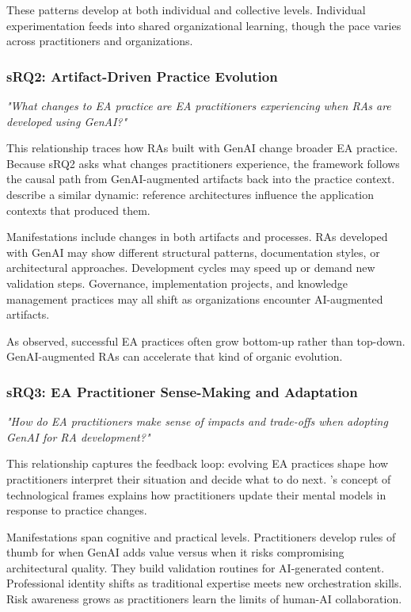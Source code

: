 These patterns develop at both individual and collective levels. Individual
experimentation feeds into shared organizational learning, though the pace
varies across practitioners and organizations.

\subsubsection{sRQ2: Artifact-Driven Practice Evolution}

\textit{"What changes to EA practice are EA practitioners experiencing when RAs are developed using GenAI?"}
\vspace{0.5em}

This relationship traces how RAs built with GenAI change broader EA practice.
Because sRQ2 asks what changes practitioners experience, the framework follows
the causal path from GenAI-augmented artifacts back into the practice context.
\textcite{angelov_framework_2012} describe a similar dynamic: reference
architectures influence the application contexts that produced them.

Manifestations include changes in both artifacts and processes. RAs developed
with GenAI may show different structural patterns, documentation styles, or
architectural approaches. Development cycles may speed up or demand new
validation steps. Governance, implementation projects, and knowledge management
practices may all shift as organizations encounter AI-augmented artifacts.

As \textcite{kotusev_enterprise_2018} observed, successful EA practices often
grow bottom-up rather than top-down. GenAI-augmented RAs can accelerate that
kind of organic evolution.

\subsubsection{sRQ3: EA Practitioner Sense-Making and Adaptation}

\textit{"How do EA practitioners make sense of impacts and trade-offs when adopting GenAI for RA development?"}
\vspace{0.5em}

This relationship captures the feedback loop: evolving EA practices shape how
practitioners interpret their situation and decide what to do next.
\textcite{orlikowski_technological_1994}'s concept of technological frames
explains how practitioners update their mental models in response to practice
changes.

Manifestations span cognitive and practical levels. Practitioners develop rules
of thumb for when GenAI adds value versus when it risks compromising
architectural quality. They build validation routines for AI-generated content.
Professional identity shifts as traditional expertise meets new orchestration
skills. Risk awareness grows as practitioners learn the limits of human-AI
collaboration.

